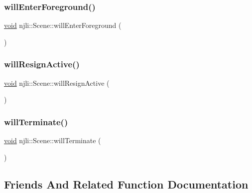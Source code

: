 \subsubsection{\texorpdfstring{will\+Enter\+Foreground()}{willEnterForeground()}}
{\footnotesize\ttfamily \mbox{\hyperlink{_thread_8h_af1e856da2e658414cb2456cb6f7ebc66}{void}} njli\+::\+Scene\+::will\+Enter\+Foreground (\begin{DoxyParamCaption}{ }\end{DoxyParamCaption})}

\mbox{\label{classnjli_1_1_scene_ac2b5630b706a264ebfd89582e6f1b58e}} 
\subsubsection{\texorpdfstring{will\+Resign\+Active()}{willResignActive()}}
{\footnotesize\ttfamily \mbox{\hyperlink{_thread_8h_af1e856da2e658414cb2456cb6f7ebc66}{void}} njli\+::\+Scene\+::will\+Resign\+Active (\begin{DoxyParamCaption}{ }\end{DoxyParamCaption})}

\mbox{\label{classnjli_1_1_scene_a48d0ef16f60e90db786bbfcda684d017}} 
\subsubsection{\texorpdfstring{will\+Terminate()}{willTerminate()}}
{\footnotesize\ttfamily \mbox{\hyperlink{_thread_8h_af1e856da2e658414cb2456cb6f7ebc66}{void}} njli\+::\+Scene\+::will\+Terminate (\begin{DoxyParamCaption}{ }\end{DoxyParamCaption})}



\subsection{Friends And Related Function Documentation}
\mbox{\label{classnjli_1_1_scene_a6db9d28bd448a131448276ee03de1e6d}} 
